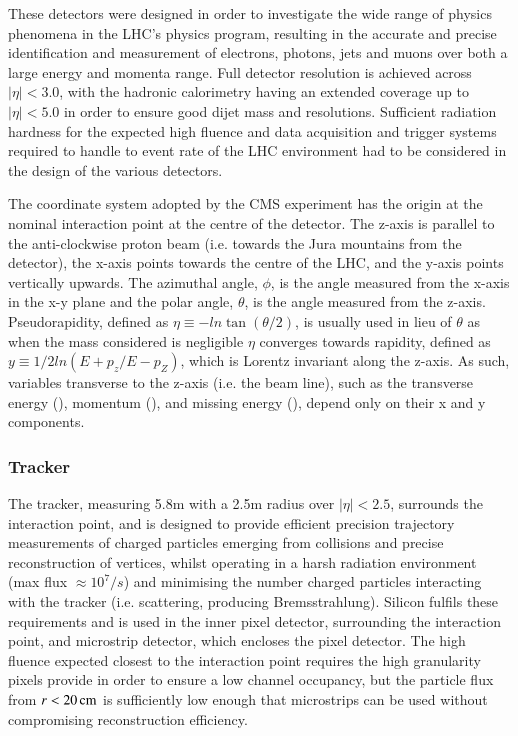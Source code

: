 These detectors were designed in order to investigate the wide range of physics phenomena in the LHC's physics program, resulting in the accurate and precise identification and measurement of electrons, photons, jets and muons over both a large energy and momenta range.
Full detector resolution is achieved across $|\eta| < 3.0$, with the hadronic calorimetry having an extended coverage up to $|\eta| < 5.0$ in order to ensure good dijet mass and \MET resolutions.
Sufficient radiation hardness for the expected high fluence and data acquisition and trigger systems required to handle to event rate of the LHC environment had to be considered in the design of the various detectors.

The coordinate system adopted by the CMS experiment has the origin at the nominal interaction point at the centre of the detector. 
The z-axis is parallel to the anti-clockwise proton beam (i.e. towards the Jura mountains from the detector), the x-axis points towards the centre of the LHC, and the y-axis points vertically upwards.
The azimuthal angle, $\phi$, is the angle measured from the x-axis in the x-y plane and the polar angle, $\theta$, is the angle measured from the z-axis.
Pseudorapidity, defined as $\eta \equiv -ln\tan(\theta/2)$, is usually used in lieu of $\theta$ as when the mass considered is negligible $\eta$ converges towards rapidity, defined as $y \equiv	1/2 ln(E+p_{z}/E-p_{Z})$, which is Lorentz invariant along the z-axis.
As such, variables transverse to the z-axis (i.e. the beam line), such as the transverse energy (\ET), momentum (\pT), and missing energy (\MET), depend only on their x and y components.

\subsubsection{Tracker}\label{subsubsec:tracker}
The tracker, measuring 5.8m with a 2.5m radius over $|\eta| < 2.5$, surrounds the interaction point, and is designed to provide efficient precision trajectory measurements of charged particles emerging from collisions and precise reconstruction of vertices, whilst operating in a harsh radiation environment (max flux $\approx 10^{7}/s$) and minimising the number charged particles interacting with the tracker (i.e. scattering, producing Bremsstrahlung).
Silicon fulfils these requirements and is used in the inner pixel detector, surrounding the interaction point, and microstrip detector, which encloses the pixel detector.
The high fluence expected closest to the interaction point requires the high granularity pixels provide in order to ensure a low channel occupancy, but the particle flux from $r < 20\,\text{cm}$ is sufficiently low enough that microstrips can be used without compromising reconstruction efficiency.

